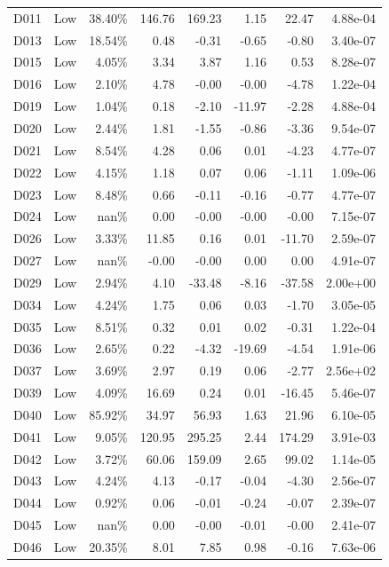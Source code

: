 \begin{tabular}{l l r r r r r r}
D011 & Low & 38.40\% & 146.76 & 169.23 & 1.15 & 22.47 & 4.88e-04 \\
D013 & Low & 18.54\% & 0.48 & -0.31 & -0.65 & -0.80 & 3.40e-07 \\
D015 & Low & 4.05\% & 3.34 & 3.87 & 1.16 & 0.53 & 8.28e-07 \\
D016 & Low & 2.10\% & 4.78 & -0.00 & -0.00 & -4.78 & 1.22e-04 \\
D019 & Low & 1.04\% & 0.18 & -2.10 & -11.97 & -2.28 & 4.88e-04 \\
D020 & Low & 2.44\% & 1.81 & -1.55 & -0.86 & -3.36 & 9.54e-07 \\
D021 & Low & 8.54\% & 4.28 & 0.06 & 0.01 & -4.23 & 4.77e-07 \\
D022 & Low & 4.15\% & 1.18 & 0.07 & 0.06 & -1.11 & 1.09e-06 \\
D023 & Low & 8.48\% & 0.66 & -0.11 & -0.16 & -0.77 & 4.77e-07 \\
D024 & Low & nan\% & 0.00 & -0.00 & -0.00 & -0.00 & 7.15e-07 \\
D026 & Low & 3.33\% & 11.85 & 0.16 & 0.01 & -11.70 & 2.59e-07 \\
D027 & Low & nan\% & -0.00 & -0.00 & 0.00 & 0.00 & 4.91e-07 \\
D029 & Low & 2.94\% & 4.10 & -33.48 & -8.16 & -37.58 & 2.00e+00 \\
D034 & Low & 4.24\% & 1.75 & 0.06 & 0.03 & -1.70 & 3.05e-05 \\
D035 & Low & 8.51\% & 0.32 & 0.01 & 0.02 & -0.31 & 1.22e-04 \\
D036 & Low & 2.65\% & 0.22 & -4.32 & -19.69 & -4.54 & 1.91e-06 \\
D037 & Low & 3.69\% & 2.97 & 0.19 & 0.06 & -2.77 & 2.56e+02 \\
D039 & Low & 4.09\% & 16.69 & 0.24 & 0.01 & -16.45 & 5.46e-07 \\
D040 & Low & 85.92\% & 34.97 & 56.93 & 1.63 & 21.96 & 6.10e-05 \\
D041 & Low & 9.05\% & 120.95 & 295.25 & 2.44 & 174.29 & 3.91e-03 \\
D042 & Low & 3.72\% & 60.06 & 159.09 & 2.65 & 99.02 & 1.14e-05 \\
D043 & Low & 4.24\% & 4.13 & -0.17 & -0.04 & -4.30 & 2.56e-07 \\
D044 & Low & 0.92\% & 0.06 & -0.01 & -0.24 & -0.07 & 2.39e-07 \\
D045 & Low & nan\% & 0.00 & -0.00 & -0.01 & -0.00 & 2.41e-07 \\
D046 & Low & 20.35\% & 8.01 & 7.85 & 0.98 & -0.16 & 7.63e-06 \\

\end{tabular}
